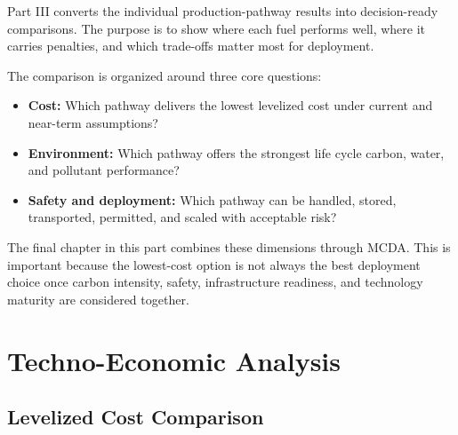\documentclass[12pt,twoside,openany]{book}
\begin{document}
Part III converts the individual production-pathway results into decision-ready comparisons. The purpose is to show where each fuel performs well, where it carries penalties, and which trade-offs matter most for deployment.

The comparison is organized around three core questions:

\begin{itemize}
    \item \textbf{Cost:} Which pathway delivers the lowest levelized cost under current and near-term assumptions?
    \item \textbf{Environment:} Which pathway offers the strongest life cycle carbon, water, and pollutant performance?
    \item \textbf{Safety and deployment:} Which pathway can be handled, stored, transported, permitted, and scaled with acceptable risk?
\end{itemize}

The final chapter in this part combines these dimensions through MCDA. This is important because the lowest-cost option is not always the best deployment choice once carbon intensity, safety, infrastructure readiness, and technology maturity are considered together.


\chapter{Techno-Economic Analysis}

\section{Levelized Cost Comparison}
\end{document}
